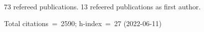 73 refereed publications. 13 refeered publications as first author.

Total citations~=~2590; h-index~=~27 (2022-06-11)